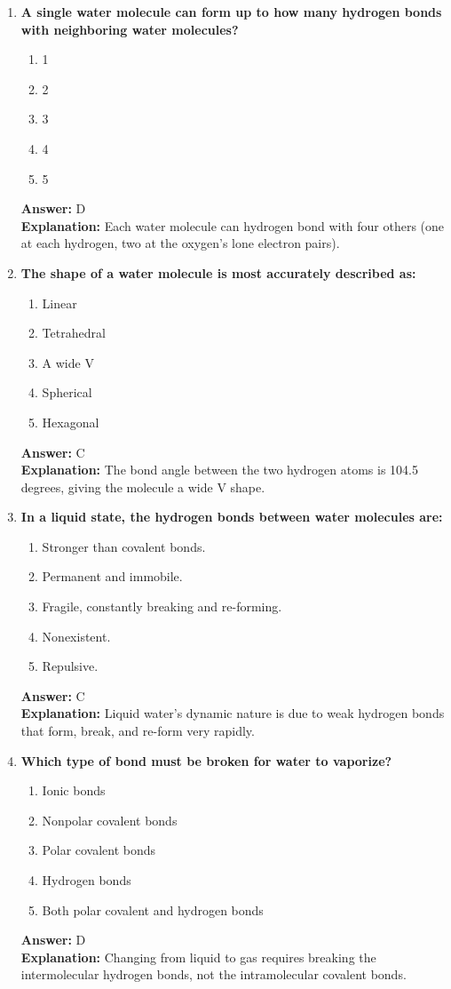 \documentclass[11pt, a4paper]{article}
\begin{document}
\begin{enumerate}
\item \textbf{A single water molecule can form up to how many hydrogen bonds with neighboring water molecules?}
\begin{enumerate}[label=\Alph*.]
    \item 1
    \item 2
    \item 3
    \item 4
    \item 5
\end{enumerate}
\textbf{Answer:} D \\
\textbf{Explanation:} Each water molecule can hydrogen bond with four others (one at each hydrogen, two at the oxygen's lone electron pairs).

\item \textbf{The shape of a water molecule is most accurately described as:}
\begin{enumerate}[label=\Alph*.]
    \item Linear
    \item Tetrahedral
    \item A wide V
    \item Spherical
    \item Hexagonal
\end{enumerate}
\textbf{Answer:} C \\
\textbf{Explanation:} The bond angle between the two hydrogen atoms is 104.5 degrees, giving the molecule a wide V shape.

\item \textbf{In a liquid state, the hydrogen bonds between water molecules are:}
\begin{enumerate}[label=\Alph*.]
    \item Stronger than covalent bonds.
    \item Permanent and immobile.
    \item Fragile, constantly breaking and re-forming.
    \item Nonexistent.
    \item Repulsive.
\end{enumerate}
\textbf{Answer:} C \\
\textbf{Explanation:} Liquid water's dynamic nature is due to weak hydrogen bonds that form, break, and re-form very rapidly.

\item \textbf{Which type of bond must be broken for water to vaporize?}
\begin{enumerate}[label=\Alph*.]
    \item Ionic bonds
    \item Nonpolar covalent bonds
    \item Polar covalent bonds
    \item Hydrogen bonds
    \item Both polar covalent and hydrogen bonds
\end{enumerate}
\textbf{Answer:} D \\
\textbf{Explanation:} Changing from liquid to gas requires breaking the intermolecular hydrogen bonds, not the intramolecular covalent bonds.


\end{enumerate}
\end{document}
